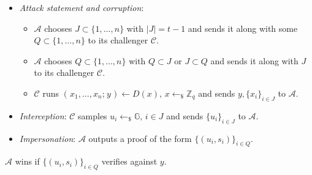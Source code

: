 \documentclass{iacrtrans}
\begin{document}
\begin{itemize}[label=$\bullet$,leftmargin=20pt,rightmargin=0pt]
	\vspace{4pt}
	\item
		\textit{Attack statement and corruption}:
			\begin{itemize}[
				label=$\circ$,leftmargin=17pt,rightmargin=21pt
			]
			\vspace{3pt}
			\item $\mathcal{A}$ chooses $J \subset \{1, \dots, n\}$
				with $|J| = t-1$ and sends it along with some
				$Q \subset \{1, \dots, n\}$
				to its challenger $\mathcal{C}$.
				\vspace{3pt}
			\item $\mathcal{A}$ chooses $Q \subset \{1, \dots, n\}$
				with $Q \subset J$  or $J \subset Q$ and
				sends it along with $J$ to its challenger
				$\mathcal{C}$.
				\vspace{3pt}
			\item $\mathcal{C}$ runs
				$(\hspace{1pt}x_1, \dots, x_n;\hspace{1pt} y\hspace{1pt})
				\leftarrow D(x),\hspace{2pt} x \leftarrow_\$ \mathbb{Z}_q$
				and sends $y, \{x_i\}_{i \in J}$
				to $\mathcal{A}$.
			\vspace{3pt}
			\end{itemize}
	\item
		\textit{Interception}:
		$\mathcal{C}$ samples
		$u_i \leftarrow_\$ \mathbb{G},\hspace{2pt} i \in J$
		and sends $\{u_i\}_{i \in J}$
		to $\mathcal{A}$.\vspace{3pt}
	\item \textit{Impersonation}:
		$\mathcal{A}$ outputs a proof of the form
		$\{(u_i, s_i)\}_{i \in Q}$.
\vspace{4pt}
\end{itemize}
\hspace*{5pt}%
\begin{minipage}{\dimexpr\textwidth-\parindent\relax}%
\hspace{3pt}
$\mathcal{A}$ wins if
$\{(u_i, s_i)\}_{i \in Q}$ verifies against $y$.
\vspace{5pt}
\end{minipage}%
\end{document}
